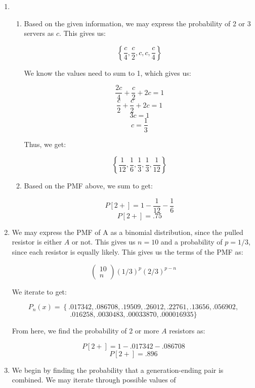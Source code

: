 \begin{enumerate}
\begin{enumerate}
    \end{enumerate}

  \item

    \begin{enumerate}
        
      \item Based on the given information, we may express the probability of 2 or 3 servers as $c$. This gives us:

        $$\left\{ \frac{c}{4},\frac{c}{2},c,c,\frac{c}{4} \right\}$$

        We know the values need to sum to 1, which gives us:

        $$\frac{2c}{4}+\frac{c}{2}+2c=1$$
        $$\frac{c}{2}+\frac{c}{2}+2c=1$$
        $$3c=1$$
        $$\boxed{c=\frac{1}{3}}$$

        Thus, we get:

        $$\left\{ \frac{1}{12},\frac{1}{6},\frac{1}{3},\frac{1}{3},\frac{1}{12} \right\}$$

      \item Based on the PMF above, we sum to get:

        $$P[2+]=1-\frac{1}{12}-\frac{1}{6}$$
        $$\boxed{P[2+]=.75}$$

    \end{enumerate}

  \item We may express the PMF of A as a binomial distribution, since the pulled resistor is either $A$ or not. This gives us $n=10$ and a probability of $p=1/3$, since each resistor is equally likely. This gives us the terms of the PMF as:

    $$\left( \begin{matrix} 10\\n\end{matrix} \right)(1/3)^{p}(2/3)^{p-n}$$

    We iterate to get:

    $$P_n(x)=\left\{.017342, .086708, .19509, .26012, .22761, .13656, .056902,$$$$.016258, .0030483, .00033870, .000016935 \}$$

    From here, we find the probability of 2 or more $A$ resistors as:

    $$P[2+]=1-.017342-.086708$$
    $$\boxed{P[2+]=.896}$$

  \item We begin by finding the probability that a generation-ending pair is combined. We may iterate through possible values of 


\end{enumerate}

